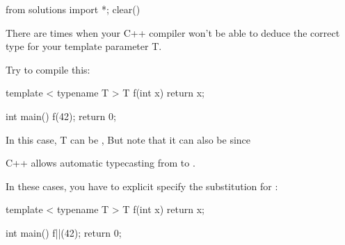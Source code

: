 \begin{python0}
from solutions import *; clear()
\end{python0}

There are times when your C++ compiler won't be able to deduce the
correct type for your template parameter T.

Try to compile this:

\begin{consolethree}[escapeinside=||]
template < typename T >
T f(int x)
{
    return x;
}

int main()
{
    f(42);
    return 0;
}
\end{consolethree}

In this case, T can be , But note that it can also be
 since

C++ allows automatic typecasting from  to
.

In these cases, you have to explicit specify the substitution for
:

\begin{consolethree}[escapeinside=||]
template < typename T >
T f(int x)
{
    return x;
}

int main()
{
    f||(42);
    return 0;
}
\end{consolethree}


